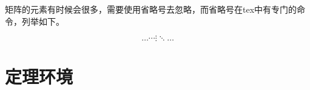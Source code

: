 矩阵的元素有时候会很多，需要使用省略号去忽略，而省略号在tex中有专门的命令，列举如下。
\begin{codeshow}
\[
\ldots \cdots \vdots \ddots \dotsc
\]
\end{codeshow}




\section{定理环境}